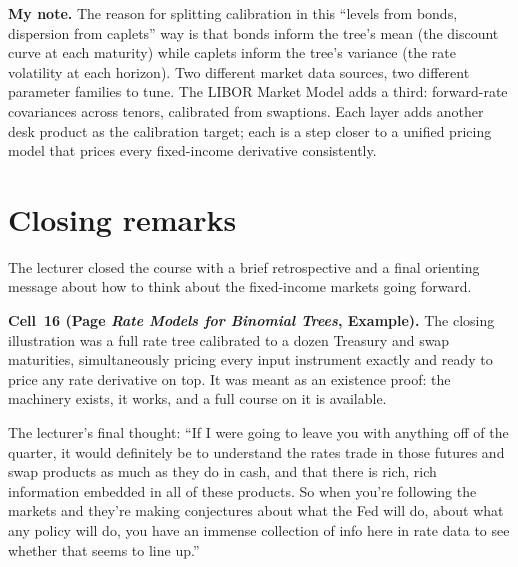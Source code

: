 \begin{checkpoint}
\textbf{My note.} The reason for splitting calibration in this
``levels from bonds, dispersion from caplets'' way is that bonds
inform the tree's mean (the discount curve at each maturity) while
caplets inform the tree's variance (the rate volatility at each
horizon). Two different market data sources, two different
parameter families to tune. The LIBOR Market Model adds a third:
forward-rate covariances across tenors, calibrated from swaptions.
Each layer adds another desk product as the calibration target;
each is a step closer to a unified pricing model that prices every
fixed-income derivative consistently.
\end{checkpoint}

\section{Closing remarks}\label{L8-sec:closing}

The lecturer closed the course with a brief retrospective and a
final orienting message about how to think about the fixed-income
markets going forward.

\begin{keyblock}
\textbf{Cell~16 (Page \emph{Rate Models for Binomial Trees}, Example).}
The closing illustration was a full rate tree calibrated to a
dozen Treasury and swap maturities, simultaneously pricing every
input instrument exactly and ready to price any rate derivative on
top. It was meant as an existence proof: the machinery exists, it
works, and a full course on it is available.
\end{keyblock}

The lecturer's final thought: ``If I were going to leave you with
anything off of the quarter, it would definitely be to understand
the rates trade in those futures and swap products as much as they
do in cash, and that there is rich, rich information embedded in
all of these products. So when you're following the markets and
they're making conjectures about what the Fed will do, about what
any policy will do, you have an immense collection of info here
in rate data to see whether that seems to line up.''

